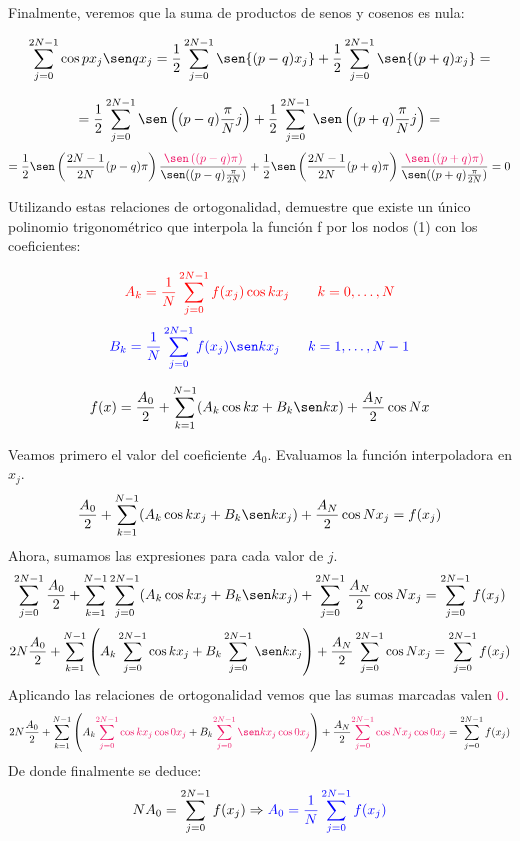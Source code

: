 \documentclass{article}
\begin{document}
\noindent Finalmente, veremos que la suma de productos de senos y cosenos es nula:

$$
\sum_{j=0}^{2N-1} \cos px_j \sen qx_j = 
\frac{1}{2}\sum_{j=0}^{2N-1} \sen{(p-q)x_j} + \frac{1}{2}\sum_{j=0}^{2N-1} \sen{(p+q)x_j} =
$$

$$
=\frac{1}{2}\sum_{j=0}^{2N-1} \sen \left((p-q)\frac{\pi}{N}j\right) +\frac{1}{2} \sum_{j=0}^{2N-1} \sen\left((p+q)\frac{\pi}{N}j\right) =
$$
$$
=\frac{1}{2} \sen\left(\frac{2N-1}{2N}(p-q)\pi\right) \frac{\textcolor{WildStrawberry}{\sen\left((p-q)\pi\right)}}{\sen((p-q)\frac{\pi}{2N})} + \frac{1}{2} \sen\left(\frac{2N-1}{2N}(p+q)\pi\right) \frac{\textcolor{WildStrawberry}{\sen\left((p+q)\pi\right)}}{\sen((p+q)\frac{\pi}{2N})} = 0
$$

\noindent Utilizando estas relaciones de ortogonalidad, demuestre que existe un único polinomio trigonométrico que interpola la función f por los nodos (1) con los coeficientes:

$$
\textcolor{red}{A_k = \frac{1}{N} \sum_{j=0}^{2N-1} f(x_j) \cos k x_j \quad \quad k = 0,\hdots,N}
$$
$$
\textcolor{blue}{B_k = \frac{1}{N} \sum_{j=0}^{2N-1} f(x_j) \sen k x_j \quad \quad k = 1,\hdots,N-1}
$$

$$
f(x) = \frac{A_0}{2} + \sum_{k=1}^{N-1} (A_k \cos k x + B_k \sen k x) + \frac{A_N}{2} \cos N x
$$

\noindent Veamos primero el valor del coeficiente $A_0$. Evaluamos la función interpoladora en $x_j$.
$$
\frac{A_0}{2} + \sum_{k=1}^{N-1} (A_k \cos k x_j + B_k \sen k x_j) + \frac{A_N}{2} \cos N x_j = f(x_j)
$$
Ahora, sumamos las expresiones para cada valor de $j$.
$$
\sum_{j=0}^{2N-1} \frac{A_0}{2} + \sum_{k=1}^{N-1} \sum_{j=0}^{2N-1} (A_k \cos k x_j + B_k \sen k x_j) + \sum_{j=0}^{2N-1} \frac{A_N}{2} \cos N x_j = \sum_{j=0}^{2N-1} f(x_j)
$$
$$
2N \frac{A_0}{2} + \sum_{k=1}^{N-1} \left ( A_k \sum_{j=0}^{2N-1} \cos k x_j + B_k \sum_{j=0}^{2N-1} \sen k x_j \right ) + \frac{A_N}{2} \sum_{j=0}^{2N-1} \cos N x_j = \sum_{j=0}^{2N-1} f(x_j)
$$
Aplicando las relaciones de ortogonalidad vemos que las sumas marcadas valen $\textcolor{WildStrawberry}{0}$.
$$
2N \frac{A_0}{2} + \sum_{k=1}^{N-1} \left ( A_k \textcolor{WildStrawberry}{\sum_{j=0}^{2N-1} \cos k x_j \cos 0 x_j} + B_k \textcolor{WildStrawberry}{\sum_{j=0}^{2N-1} \sen k x_j \cos 0 x_j} \right ) + \frac{A_N}{2} \textcolor{WildStrawberry}{\sum_{j=0}^{2N-1} \cos N x_j \cos 0 x_j} = \sum_{j=0}^{2N-1} f(x_j)
$$
De donde finalmente se deduce:
$$
N A_0 = \sum_{j=0}^{2N-1} f(x_j) \Rightarrow \textcolor{blue}{A_0 = \frac{1}{N} \sum_{j=0}^{2N-1} f(x_j)}
$$
\end{document}
